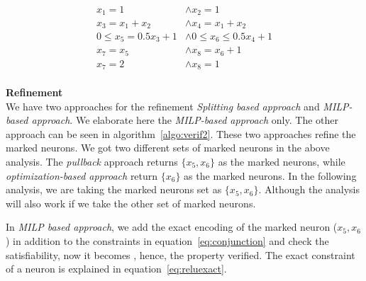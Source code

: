 \begin{equation}
    \begin{aligned}
        x_1 = 1 & \land x_2 = 1 \\
        x_3 = x_1 + x_2 & \land x_4 = x_1 + x_2 \\
        0 \leq x_5 = 0.5x_3 + 1 & \land 0\leq x_6 \leq 0.5x_4 + 1 \\ 
        x_7 = x_5 & \land x_8 = x_6 + 1 \\
        x_7 = 2 & \land x_8 = 1
    \end{aligned}
\label{eq:opt1}
\end{equation}
\\
\textbf{Refinement} \\
We have two approaches for the refinement {\em Splitting based approach} and {\em MILP-based approach}.
We elaborate here the {\em MILP-based approach} only. The other approach can be seen in algorithm~\ref{algo:verif2}. 
These two approaches refine the marked neurons. We got two different sets of marked neurons in the above analysis. 
The {\em pullback} approach returns $\{x_5, x_6\}$ as the marked neurons, while {\em optimization-based approach}
return $\{x_6\}$ as the marked neurons. In the following analysis, we are taking the marked neurons set as $\{x_5, x_6\}$.
Although the analysis will also work if we take the other set of marked neurons.

In {\em MILP based approach}, we add the exact encoding of the marked neuron ($x_5, x_6$) in addition to the constraints
in equation~\ref{eq:conjunction} and check the satisfiability, now it becomes \unsat{}, hence, the property verified. 
The exact constraint of a \relu{} neuron is explained in equation~\ref{eq:reluexact}. 

